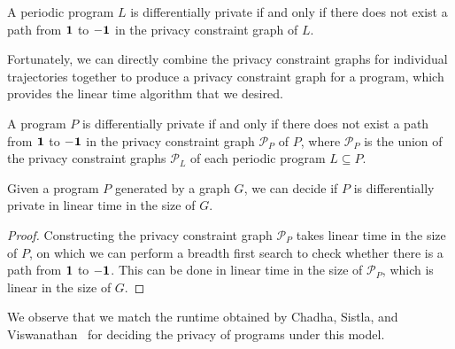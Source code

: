 \begin{prop}\label{privacyConstraintGraphProp}
    A periodic program $L$ is differentially private if and only if there does not exist a path from $\bf 1$ to $\bf -1$ in the privacy constraint graph of $L$.
\end{prop}

Fortunately, we can directly combine the privacy constraint graphs for individual trajectories together to produce a privacy constraint graph for a program, which provides the linear time algorithm that we desired.

\begin{prop}\label{programPrivacyConstraintGraphPathReq}
    A program $P$ is differentially private if and only if there does not exist a path from $\bf 1$ to $\bf -1$ in the privacy constraint graph $\mathcal{P}_P$ of $P$, where $\mathcal{P}_P$ is the union of the privacy constraint graphs $\mathcal{P}_L$ of each periodic program $L\subseteq P$.
\end{prop}

\begin{thm}\label{LinearTimeDecidingPrograms}
    Given a program $P$ generated by a graph $G$, we can decide if $P$ is differentially private in linear time in the size of $G$.
\end{thm}

\begin{proof}
    Constructing the privacy constraint graph $\mathcal{P}_P$ takes linear time in the size of $P$, on which we can perform a breadth first search to check whether there is a path from $\bf 1$ to $\bf -1$. This can be done in linear time in the size of $\mathcal{P}_P$, which is linear in the size of $G$.
\end{proof}

We observe that we match the runtime obtained by Chadha, Sistla, and Viswanathan~\cite{chadhaLinearTimeDecidability2021} for deciding the privacy of programs under this model. 


